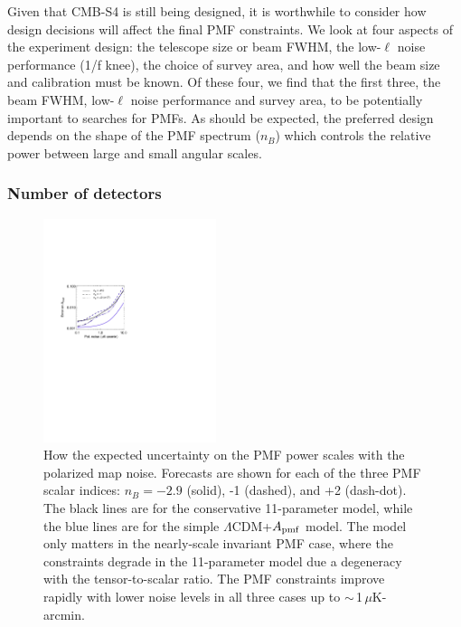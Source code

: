 \documentclass[apj]{emulateapj}
\newcommand{\apmf}{\ensuremath{A_{\rm pmf}}}
\newcommand{\lcdm}{\ensuremath{\Lambda}CDM}
\newcommand{\ukarcmin}{\ensuremath{\mu}K-arcmin}
\begin{document}
Given that CMB-S4 is still being designed, it is worthwhile to consider how design decisions will affect the final PMF constraints. 
We look at four aspects of the experiment design: the telescope size or beam FWHM,  the low-$\ell$ noise performance (1/f knee), the choice of survey area,  and how well the beam size and calibration must be known. 
Of these four, we find that the first three, the beam FWHM, low-$\ell$ noise performance and survey area, to be potentially important to searches for PMFs. 
As should be expected, the preferred design depends on the shape of the PMF spectrum ($n_B$) which controls  the relative power between large and small angular scales. 

\subsubsection{Number of detectors}

\begin{figure}[htb]\centering
\includegraphics[width=0.45\textwidth,clip,trim={1.5cm 12.5cm 11cm 7.5cm}]{pmf_sens.pdf}
  \caption[]{ \label{fig:ndetector}
  How the expected uncertainty on the PMF power scales with the polarized map noise. 
  Forecasts are shown for each of the three PMF scalar indices: $n_B = -2.9$ (solid), -1 (dashed), and +2 (dash-dot). 
  The black lines are for the conservative 11-parameter model, while the blue lines are for the simple \lcdm{}+\apmf{} model. 
  The model only matters in the nearly-scale invariant PMF case, where the constraints degrade in the 11-parameter model due a degeneracy with the tensor-to-scalar ratio. 
  The PMF constraints improve rapidly with lower noise levels in all three cases up to $\sim$\,1\,\ukarcmin. 
    }
\end{figure}
\end{document}
